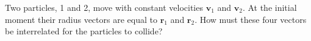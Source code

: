 
\item Two particles, 1 and 2, move with constant velocities \( \mathbf{v}_1 \) and \( \mathbf{v}_2 \). At the initial moment their radius vectors are equal to \( \mathbf{r}_1 \) and \( \mathbf{r}_2 \). How must these four vectors be interrelated for the particles to collide?
